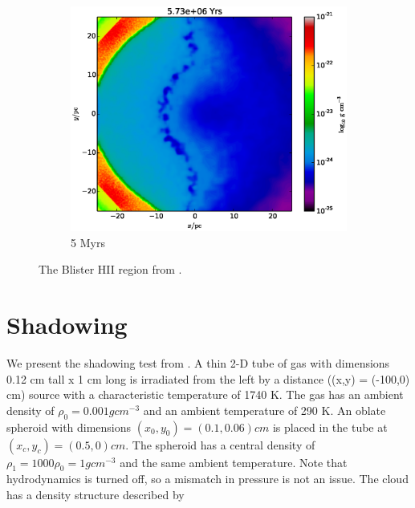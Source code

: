 \begin{figure}
\begin{subfigure}[b]{0.3\textwidth}
                \label{fig:champagne2}
        \end{subfigure}
         ~ 
        \begin{subfigure}[b]{0.3\textwidth}
                \includegraphics[width=\textwidth]{graphics/blister25600400rhoslice.eps}
                \caption{5 Myrs}
                \label{fig:champagne3}
        \end{subfigure}
        \caption[A champagne flow.]{The Blister HII region from \citet{gendelevKrumholz12}.}
        \label{fig:champagne}
\end{figure}

\section{Shadowing}
\label{sec:shadowing}

We present the shadowing test from \citet{hayesNorman03,gonzalezEt07,skinnerOstriker13}. A thin 2-D tube of gas with dimensions 0.12 cm tall x 1 cm long is irradiated from the left by a distance ((x,y) = (-100,0) cm) source with a characteristic temperature of 1740 K. The gas has an ambient density of $\rho_0 = 0.001 g cm^{-3}$ and an ambient temperature of 290 K. An oblate spheroid with dimensions $(x_0,y_0) = (0.1,0.06) cm$ is placed in the tube at $(x_c,y_c) = (0.5,0) cm$. The spheroid has a central density of $\rho_1 = 1000\rho_0 = 1 g cm^{-3}$ and the same ambient temperature. Note that hydrodynamics is turned off, so a mismatch in pressure is not an issue. The cloud has a density structure described by

